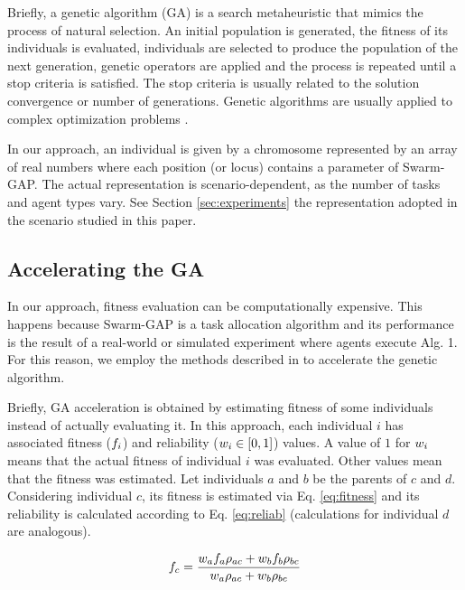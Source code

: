 \documentclass[conference]{IEEEtran}
\begin{document}
Briefly, a genetic algorithm (GA) is a search metaheuristic that mimics the process of natural selection. An initial population is generated, the fitness of its individuals is evaluated, individuals are selected to produce the population of the next generation, genetic operators are applied and the process is repeated until a stop criteria is satisfied. The stop criteria is usually related to the solution convergence or number of generations. Genetic algorithms are usually applied to complex optimization problems \cite{Haupt&Haupt2004}.

In our approach, an individual is given by a chromosome represented by an array of real numbers where each position (or locus) contains a parameter of Swarm-GAP. %
The actual representation is scenario-dependent, as the number of tasks and agent types vary. See Section \ref{sec:experiments} the representation adopted in the scenario studied in this paper.

\subsection{Accelerating the GA}
In our approach, fitness evaluation can be computationally expensive. This happens because Swarm-GAP is a task allocation algorithm and its performance is the result of a real-world or simulated experiment where agents execute Alg. 1. For this reason, we employ the methods described in \cite{Salami&Hendtlass2003} to accelerate the genetic algorithm. 

Briefly, GA acceleration is obtained by estimating fitness of some individuals instead of actually evaluating it. In this approach, each individual $i$ has associated fitness ($f_{i}$) and reliability ($w_{i} \in [0,1]$) values. A value of $1$ for $w_{i}$ means that the actual fitness of individual $i$ was evaluated. Other values mean that the fitness was estimated. Let individuals $a$ and $b$ be the parents of $c$ and $d$. Considering individual $c$, its fitness is estimated via Eq. \ref{eq:fitness} and its reliability is calculated according to Eq. \ref{eq:reliab} (calculations for individual $d$ are analogous). 

\begin{equation}
\label{eq:fitness}
\fit{c} = \frac{\reliab{a}\fit{a}\simil{a}{c} + \reliab{b}\fit{b}\simil{b}{c}}{\reliab{a}\simil{a}{c} + \reliab{b}\simil{b}{c}}
\end{equation}
\end{document}

